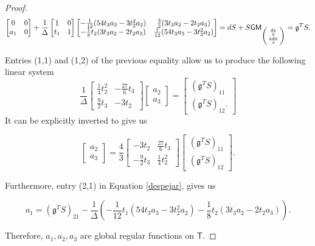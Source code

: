 \documentclass[10pt,a4paper]{amsart}
\begin{document}
\begin{proof}
\begin{equation}\label{despejar}
\begin{bmatrix}
0 & 0\\
a_1 & 0
\end{bmatrix}
+\frac{1}{\Delta}\begin{bmatrix}
1 & 0\\
t_1 & 1
\end{bmatrix}
\begin{bmatrix}
-\frac{1}{12}(54t_3a_3-3t_2^2a_2) & \frac{3}{2}(3t_3a_2-2t_2a_3)\\
-\frac{1}{8}t_2(3t_3a_2-2t_2a_3) & \frac{1}{12}(54t_3a_3-3t_2^2a_2)
\end{bmatrix}=dS+S\mathsf{GM}_{\begin{psmallmatrix}\frac{dx}{y}\\ \frac{xdx}{y}\end{psmallmatrix}}=\mathfrak{g}^TS.
\end{equation}

Entries (1,1) and (1,2) of the previous equality allow us to produce the following linear system
\begin{equation}
\frac{1}{\Delta}\begin{bmatrix}
\frac{1}{4}t_2^2 & -\frac{27}{6}t_3\\
\frac{9}{2}t_3 & -3t_2
\end{bmatrix}\begin{bmatrix}
a_2 \\
a_3
\end{bmatrix}=\begin{bmatrix}
(\mathfrak{g}^TS)_{11}\\
(\mathfrak{g}^TS)_{12}.
\end{bmatrix}
\end{equation}
It can be explicitly inverted to give us 

\begin{equation}
\begin{bmatrix}
a_2 \\
a_3
\end{bmatrix}=\frac{4}{3}\begin{bmatrix}
-3t_2 & \frac{27}{6}t_3\\
-\frac{9}{2}t_3 & \frac{1}{4}t_2^2
\end{bmatrix}\begin{bmatrix}
(\mathfrak{g}^TS)_{11}\\
(\mathfrak{g}^TS)_{12}
\end{bmatrix}.
\end{equation}

Furthermore, entry (2,1) in Equation \ref{despejar}, gives us 

\begin{equation}a_1=(\mathfrak{g}^TS)_{21}-\frac{1}{\Delta}(-\frac{1}{12}t_1(54t_3a_3-3t_2^2a_2)-\frac{1}{8}t_2(3t_3a_2-2t_2a_3)).
\end{equation}

Therefore, $a_1,a_2,a_3$ are global regular functions on $\mathsf{T}$.
\end{proof}
\end{document}
